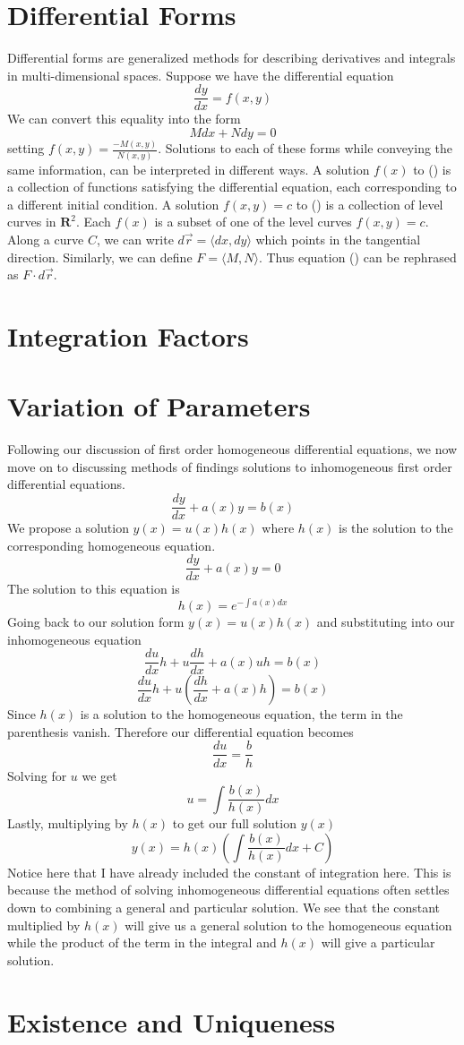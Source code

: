 \section{Differential Forms}
Differential forms are generalized methods for describing derivatives and integrals in multi-dimensional spaces.
Suppose we have the differential equation
\[\frac{dy}{dx} = f(x,y)\]
We can convert this equality into the form
\[Mdx + Ndy = 0\]
setting $f(x,y) = \frac{-M(x,y)}{N(x,y)}$.
Solutions to each of these forms while conveying the same information, can be interpreted in different ways. A solution $f(x)$ to () is a collection of functions satisfying the differential equation, each corresponding to a different initial condition. A solution $f(x,y) = c$ to () is a collection of level curves in $\mathbf{R}^2$. Each $f(x)$ is a subset of one of the level curves $f(x,y) = c$. 
\newline
\hfill \break
Along a curve $C$, we can write $ d\vec{r} = \langle dx, dy \rangle$ which points in the tangential direction. Similarly, we can define $F = \langle M, N \rangle$. Thus equation () can be rephrased as $F \cdot d\vec{r}$. \\
\hfill \break

\section{Integration Factors}






\section{Variation of Parameters}
Following our discussion of first order homogeneous differential equations, we now move on to discussing methods of findings solutions to inhomogeneous first order differential equations.
\[\frac{dy}{dx} + a(x)y = b(x)\]
We propose a solution $y(x) = u(x)h(x)$ where $h(x)$ is the solution to the corresponding homogeneous equation.
\[\frac{dy}{dx} +a(x)y = 0\]
The solution to this equation is
\[h(x) = e^{-\int a(x)dx}\]
Going back to our solution form $y(x) = u(x)h(x)$ and substituting into our inhomogeneous equation
\[\frac{du}{dx}h + u\frac{dh}{dx} + a(x)uh = b(x)\]
\[\frac{du}{dx}h + u\left( \frac{dh}{dx} + a(x)h \right) = b(x)\]
Since $h(x)$ is a solution to the homogeneous equation, the term in the parenthesis vanish. Therefore our differential equation becomes
\[\frac{du}{dx} = \frac{b}{h}\]
Solving for $u$ we get
\[u = \int \frac{b(x)}{h(x)}dx\]
Lastly, multiplying by $h(x)$ to get our full solution $y(x)$
\[y(x) = h(x)\left(\int \frac{b(x)}{h(x)}dx + C\right)\]
Notice here that I have already included the constant of integration here. This is because the method of solving inhomogeneous differential equations often settles down to combining a general and particular solution. We see that the constant multiplied by $h(x)$ will give us a general solution to the homogeneous equation while the product of the term in the integral and $h(x)$ will give a particular solution. 


\section{Existence and Uniqueness}
